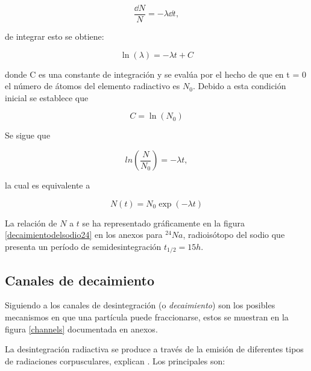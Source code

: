 \begin{equation}
\frac{\dd{N}}{N} = -\lambda \dd{t},
\end{equation} 

\noindent de integrar esto se obtiene: 

\begin{equation}
\ln( \lambda ) = -\lambda t + C\label{ecuacionlambda}
\end{equation}

\noindent donde C es una constante de integración y se evalúa por el hecho de que en t = 0 el número de átomos del elemento radiactivo es $N_0$. Debido a esta condición inicial se establece que 

\begin{equation*}
C = \ln(N_0)
\end{equation*}

Se sigue que 

\begin{equation*}
ln\left( \frac{N}{N_0} \right) = - \lambda t,
\end{equation*}

\noindent la cual es equivalente a

\begin{equation*}
N(t) = N_0 \exp(- \lambda t)
\end{equation*}

\noindent La relación de $N$ a $t$ se ha representado gráficamente en la figura \ref{decaimientodelsodio24} en los anexos para $ ^{24} Na$, radioisótopo del sodio que presenta un período de semidesintegración $t_{1/2} = 15h$.

\subsection{Canales de decaimiento}

Siguiendo a \cite{Cottingham.2001, Basdevant.2005, Krane.1987} los canales de desintegración (o \textit{decaimiento}) son los posibles mecanismos en que una partícula puede fraccionarse, estos se muestran en la figura \ref{channels} documentada en anexos.

\noindent La desintegración radiactiva se produce a través de la emisión de diferentes tipos de radiaciones corpusculares, explican \cite{Krane.1987, Podgorsak.2016, Sanctis.2016}. Los principales son: 

